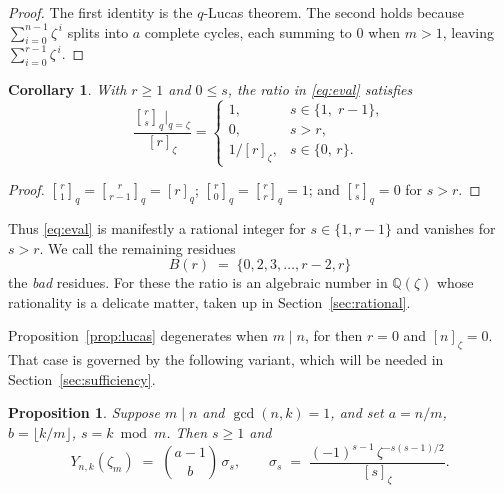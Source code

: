 \documentclass[11pt,a4paper]{article}
\theoremstyle{plain}
\newtheorem{proposition}[theorem]{Proposition}
\newtheorem{corollary}[theorem]{Corollary}
\theoremstyle{definition}
\theoremstyle{remark}
\newcommand{\Q}{\mathbb{Q}}
\newcommand{\qint}[1]{[#1]_q}
\newcommand{\qbin}[2]{\genfrac[]{0pt}{}{#1}{#2}_{q}}
\begin{document}
\begin{proof}
The first identity is the $q$-Lucas theorem. The second holds because
$\sum_{i=0}^{n-1}\zeta^{\,i}$ splits into $a$ complete cycles, each summing to $0$ when
$m>1$, leaving $\sum_{i=0}^{r-1}\zeta^{\,i}$.
\end{proof}

\begin{corollary}\label{cor:rational}
With $r\ge1$ and $0\le s$, the ratio in \eqref{eq:eval} satisfies
\[
  \frac{\qbin{r}{s}\big|_{q=\zeta}}{[r]_\zeta}
  =\begin{cases}
    1, & s\in\{1,\;r-1\},\\[2pt]
    0, & s>r,\\[2pt]
    1/[r]_\zeta, & s\in\{0,\,r\}.
  \end{cases}
\]
\end{corollary}

\begin{proof}
$\qbin{r}{1}=\qbin{r}{r-1}=\qint{r}$; $\qbin{r}{0}=\qbin{r}{r}=1$; and $\qbin{r}{s}=0$ for
$s>r$.
\end{proof}

Thus \eqref{eq:eval} is manifestly a rational integer for $s\in\{1,r-1\}$ and vanishes for
$s>r$. We call the remaining residues
\[
  B(r)\;=\;\{0,2,3,\dots,r-2,r\}
\]
the \emph{bad} residues. For these the ratio is an algebraic number in $\Q(\zeta)$ whose
rationality is a delicate matter, taken up in Section~\ref{sec:rational}.

Proposition~\ref{prop:lucas} degenerates when $m\mid n$, for then $r=0$ and $[n]_\zeta=0$.
That case is governed by the following variant, which will be needed in
Section~\ref{sec:sufficiency}.

\begin{proposition}\label{prop:mdivn}
Suppose $m\mid n$ and $\gcd(n,k)=1$, and set $a=n/m$, $b=\lfloor k/m\rfloor$,
$s=k\bmod m$. Then $s\ge1$ and
\begin{equation}\label{eq:evalm}
  Y_{n,k}(\zeta_m)\;=\;\binom{a-1}{b}\,\sigma_s,
  \qquad
  \sigma_s\;=\;\frac{(-1)^{s-1}\,\zeta^{-s(s-1)/2}}{[s]_\zeta}.
\end{equation}
\end{proposition}
\end{document}
